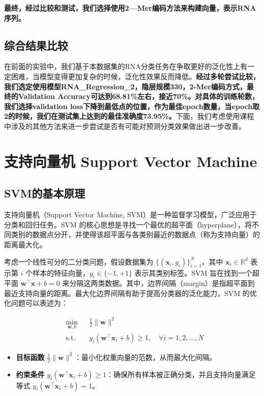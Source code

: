 \documentclass[a4paper,11pt,AutoFakeBold]{ctexart}
\begin{document}
\textbf{最终，经过比较和测试，我们选择使用2—Mer编码方法来构建向量，表示RNA序列。}


\subsection{综合结果比较}
在前面的实验中，我们基于本数据集的RNA分类任务在争取更好的泛化性上有一定困难，当模型变得更加复杂的时候，泛化性效果反而降低。\textbf{经过多轮尝试比较，我们选定使用模型RNA\_Regression\_2，隐层规模330，2-Mer编码方式，最终的Validation Accuracy可达到68.81\%左右，接近70\%。对具体的训练轮数，我们选择validation loss下降到最低点的位置，作为最佳epoch数量，当epoch取2的时候，我们在测试集上达到的最佳准确度73.95\%。}下面，我们考虑使用课程中涉及的其他方法来进一步尝试是否有可能对预测分类效果做出进一步改善。


\section{支持向量机 Support Vector Machine}

\subsection{SVM的基本原理}


支持向量机（Support Vector Machine, SVM）是一种监督学习模型，广泛应用于分类和回归任务。SVM 的核心思想是寻找一个最优的超平面（hyperplane），将不同类别的数据点分开，并使得该超平面与各类别最近的数据点（称为支持向量）的距离最大化。

考虑一个线性可分的二分类问题，假设数据集为 $\{(\mathbf{x}_i, y_i)\}_{i=1}^N$，其中 $\mathbf{x}_i \in \mathbb{R}^d$ 表示第 $i$ 个样本的特征向量，$y_i \in \{-1, +1\}$ 表示其类别标签。SVM 旨在找到一个超平面 $ \mathbf{w}^\top \mathbf{x} + b = 0 $ 来分隔这两类数据。其中，边界间隔（margin）是指超平面到最近支持向量的距离。最大化边界间隔有助于提高分类器的泛化能力，SVM 的优化问题可以表述为：

\begin{equation}
\begin{aligned}
& \underset{\mathbf{w}, b}{\text{min}} && \frac{1}{2} \|\mathbf{w}\|^2 \\
& \text{s.t.} && y_i (\mathbf{w}^\top \mathbf{x}_i + b) \geq 1, \quad \forall i = 1, 2, \dots, N
\end{aligned}
\end{equation}

\begin{itemize}
    \item \textbf{目标函数} $\frac{1}{2} \|\mathbf{w}\|^2$：最小化权重向量的范数，从而最大化间隔。
    \item \textbf{约束条件} $y_i (\mathbf{w}^\top \mathbf{x}_i + b) \geq 1$：确保所有样本被正确分类，并且支持向量满足等式 $y_i (\mathbf{w}^\top \mathbf{x}_i + b) = 1$。
\end{itemize}
\end{document}
